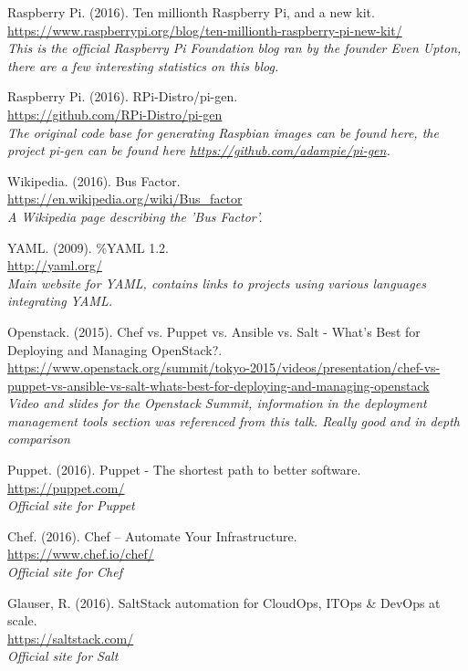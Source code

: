 \documentclass[12pt,a4paper]{report}
\begin{document}
\begin{thebibliography}{9}
Raspberry Pi. (2016). Ten millionth Raspberry Pi, and a new kit.
\\\url{https://www.raspberrypi.org/blog/ten-millionth-raspberry-pi-new-kit/}
\\\textit{This is the official Raspberry Pi Foundation blog ran by the founder Even Upton, there are a few interesting statistics on this blog.}

Raspberry Pi. (2016). RPi-Distro/pi-gen.
\\\url{https://github.com/RPi-Distro/pi-gen}
\\\textit{The original code base for generating Raspbian images can be found here, the project pi-gen can be found here \url{https://github.com/adampie/pi-gen}.}

Wikipedia. (2016). Bus Factor.
\\\url{https://en.wikipedia.org/wiki/Bus_factor}
\\\textit{A Wikipedia page describing the 'Bus Factor'.}

YAML. (2009). \%YAML 1.2.
\\\url{http://yaml.org/}
\\\textit{Main website for YAML, contains links to projects using various languages integrating YAML.}

Openstack. (2015). Chef vs. Puppet vs. Ansible vs. Salt - What's Best for Deploying and Managing OpenStack?.
\\\url{https://www.openstack.org/summit/tokyo-2015/videos/presentation/chef-vs-puppet-vs-ansible-vs-salt-whats-best-for-deploying-and-managing-openstack}
\\\textit{Video and slides for the Openstack Summit, information in the deployment management tools section was referenced from this talk. Really good and in depth comparison}

Puppet. (2016). Puppet - The shortest path to better software.
\\\url{https://puppet.com/}
\\\textit{Official site for Puppet}

Chef. (2016). Chef – Automate Your Infrastructure.
\\\url{https://www.chef.io/chef/}
\\\textit{Official site for Chef}

Glauser, R. (2016). SaltStack automation for CloudOps, ITOps \& DevOps at scale.
\\\url{https://saltstack.com/}
\\\textit{Official site for Salt}


\end{thebibliography}
\end{document}
